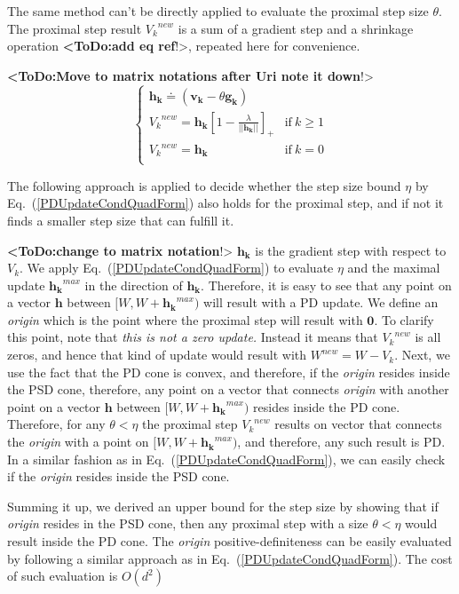 \documentclass[twoside,11pt]{article}
\newcommand\todo[1]{\textbf{<ToDo:#1}!>}
\newcommand\mat[1]{{#1}}
\renewcommand\vec[1]{\mathbf{#1}}
\newcommand{\W}{\mat{W}}
\newcommand{\newW}{{\mat{W^{new}}}}
\newcommand{\eqdef}{\doteq}
\newcommand{\VVk}{\vec{v_k}}
\newcommand{\gk}{\vec{g_k}}
\newcommand{\hk}{\vec{h_k}}
\newcommand{\Vk}{\mat{V_k}}
\renewcommand{\eqref}[1]{Eq.~(\ref{#1})}
\begin{document}
The same method can't be directly applied to evaluate the proximal step size $\theta$. The proximal step result $\Vk^{new}$ is a sum of a gradient step and a shrinkage operation \todo{add eq ref}, repeated here for convenience. 

\todo{Move to matrix notations after Uri note it down}
\begin{equation*}
 \begin{cases}
   \hk \eqdef (\VVk-\theta \gk) \\ 
   \Vk^{new} = \hk [1 - \frac{\lambda}{||\hk||}]_+ & \text{if}\  k \geq 1\\
   \Vk^{new} = \hk & \text{if}\ k = 0 \\ 
 \end{cases}
\end{equation*}

The following approach is applied to decide whether the step size bound $\eta$ by \eqref{PDUpdateCondQuadForm} also holds for the proximal step, and if not it finds a smaller step size that can fulfill it.


\newcommand{\Vkorigin}{\emph{origin }}
\todo{change to matrix notation}
$\hk$ is the gradient step with respect to $\Vk$. We apply \eqref{PDUpdateCondQuadForm} to evaluate $\eta$ and the maximal update $\hk^{max}$ in the direction of $\hk$. Therefore, it is easy to see that any point on a vector $\vec{h}$ between $[\W, \W + \hk^{max})$ will result with a PD update. We define an \Vkorigin which is the point where the proximal step will result with $\vec{0}$. To clarify this point, note that \emph{this is not a zero update.} Instead it means that $\Vk^{new}$ is all zeros, and hence that kind of update would result with $\newW = \W - \Vk$. Next, we use the fact that the PD cone is convex, and therefore, if the \Vkorigin resides inside the PSD cone, therefore, any point on a vector that connects \Vkorigin with another point on a vector $\vec{h}$ between $[\W, \W + \hk^{max})$ resides inside the PD cone. Therefore, for any $\theta < \eta$ the proximal step $\Vk^{new}$ results on vector that connects the \Vkorigin with a point on $[\W, \W + \hk^{max})$, and therefore, any such result is PD. In a similar fashion as in \eqref{PDUpdateCondQuadForm}, we can easily check if the \Vkorigin resides inside the PSD cone.  

Summing it up, we derived an upper bound for the step size by showing that if \Vkorigin resides in the PSD cone, then any proximal step with a size $\theta < \eta$ would result inside the PD cone. The \Vkorigin positive-definiteness can be easily evaluated by following a similar approach as in \eqref{PDUpdateCondQuadForm}. The cost of such evaluation is $O(d^2)$
\end{document}
